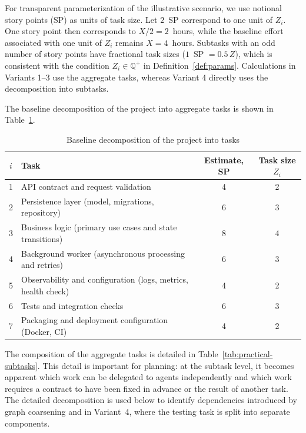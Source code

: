 For transparent parameterization of the illustrative scenario, we use notional
story points (SP) as units of task size. Let $2$~SP correspond to one unit of
$Z_i$. One story point then corresponds to $X/2 = 2$~hours, while the baseline
effort associated with one unit of $Z_i$ remains $X = 4$~hours. Subtasks with
an odd number of story points have fractional task sizes ($1$~SP $= 0.5\,Z$),
which is consistent with the condition $Z_i \in \mathbb{Q}^{+}$ in
Definition~\ref{def:params}. Calculations in Variants 1--3 use the aggregate tasks, whereas
Variant 4 directly uses the decomposition into subtasks.

The baseline decomposition of the project into aggregate tasks is shown in
Table~\ref{tab:practical-baseline}.

\begin{table}[ht!]
\centering
\caption{Baseline decomposition of the project into tasks}
\label{tab:practical-baseline}
\begin{tabularx}{\textwidth}{@{}c>{\raggedright\arraybackslash}Xcc@{}}
\toprule
$i$ & Task & Estimate, SP & Task size $Z_i$ \\
\midrule
1 & API contract and request validation & 4 & 2 \\
2 & Persistence layer (model, migrations, repository) & 6 & 3 \\
3 & Business logic (primary use cases and state transitions) & 8 & 4 \\
4 & Background worker (asynchronous processing and retries) & 6 & 3 \\
5 & Observability and configuration (logs, metrics, health check) & 4 & 2 \\
6 & Tests and integration checks & 6 & 3 \\
7 & Packaging and deployment configuration (Docker, CI) & 4 & 2 \\
\bottomrule
\end{tabularx}
\end{table}

The composition of the aggregate tasks is detailed in
Table~\ref{tab:practical-subtasks}. This detail is important for planning: at
the subtask level, it becomes apparent which work can be delegated to agents
independently and which work requires a contract to have been fixed in advance
or the result of another task. The detailed decomposition is used below to
identify dependencies introduced by graph coarsening and in Variant~4, where
the testing task is split into separate components.

